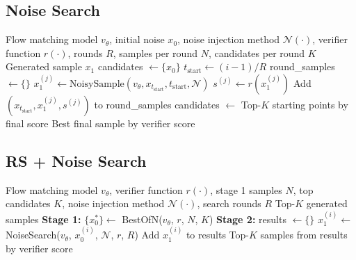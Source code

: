 \documentclass{article} %
\begin{document}
\subsection{Noise Search}
\label{app:noise-search}

\begin{algorithm}[H]
\caption{Multi-Round Noise Search}
\label{alg:noise-search}
\begin{algorithmic}[1]
\Require Flow matching model $v_\theta$, initial noise $x_0$, noise injection method $\mathcal{N}(\cdot)$, verifier function $r(\cdot)$, rounds $R$, samples per round $N$, candidates per round $K$
\Ensure Generated sample $x_1$
\State candidates $\leftarrow \{x_0\}$ 
    \State $t_{\text{start}} \leftarrow (i-1) / R$ 
    \State round\_samples $\leftarrow \{\}$
            \State $x_1^{(j)} \leftarrow \text{NoisySample}(v_\theta, x_{t_{\text{start}}}, t_{\text{start}}, \mathcal{N})$
            \State $s^{(j)} \leftarrow r(x_1^{(j)})$
            \State Add $(x_{t_{\text{start}}}, x_1^{(j)}, s^{(j)})$ to round\_samples
        \EndFor
    \EndFor
        \State candidates $\leftarrow$ Top-$K$ starting points by final score
    \Else
        \State \Return Best final sample by verifier score
    \EndIf
\EndFor
\end{algorithmic}
\end{algorithm}


\subsection{RS + Noise Search}
\label{app:rs-noise-search}

\begin{algorithm}[H]
\caption{Two-Stage RS + Noise Search}
\label{alg:best-of-n-noise-search}
\begin{algorithmic}[1]
\Require Flow matching model $v_\theta$, verifier function $r(\cdot)$, stage 1 samples $N$, top candidates $K$, noise injection method $\mathcal{N}(\cdot)$, search rounds $R$
\Ensure Top-$K$ generated samples
\State \textbf{Stage 1:} $\{x_0^*\} \leftarrow$ BestOfN($v_\theta$, $r$, $N$, $K$) 
\State \textbf{Stage 2:} results $\leftarrow \{\}$
    \State $x_1^{(i)} \leftarrow$ NoiseSearch($v_\theta$, $x_0^{(i)}$, $\mathcal{N}$, $r$, $R$) 
    \State Add $x_1^{(i)}$ to results
\EndFor
\State \Return Top-$K$ samples from results by verifier score
\end{algorithmic}
\end{algorithm}
\end{document}
